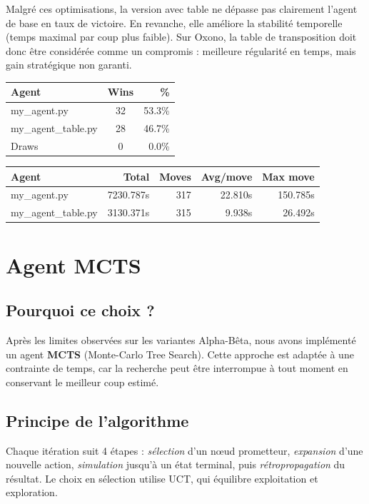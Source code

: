 \bigskip

Malgré ces optimisations, la version avec table ne dépasse pas clairement l'agent de base en taux de victoire. En revanche, elle améliore la stabilité temporelle (temps maximal par coup plus faible). Sur Oxono, la table de transposition doit donc être considérée comme un compromis : meilleure régularité en temps, mais gain stratégique non garanti.

\begin{tabular}{|l|c|r|}
    \hline
    Agent & Wins & \% \\
    \hline
    my\_agent.py & 32 & 53.3\% \\
    my\_agent\_table.py & 28 & 46.7\% \\
    Draws & 0 & 0.0\%\\
    \hline 
\end{tabular}
\begin{tabular}{|l|r|r|r|r|}
    \hline
    Agent & Total & Moves & Avg/move & Max move \\
    \hline
    my\_agent.py & 7230.787s & 317 & 22.810s & 150.785s \\
    my\_agent\_table.py & 3130.371s & 315 & 9.938s & 26.492s \\
    \hline
\end{tabular}

\section{Agent MCTS}

\subsection{Pourquoi ce choix ?}
Après les limites observées sur les variantes Alpha-Bêta, nous avons implémenté un agent \textbf{MCTS} (Monte-Carlo Tree Search). Cette approche est adaptée à une contrainte de temps, car la recherche peut être interrompue à tout moment en conservant le meilleur coup estimé.

\subsection{Principe de l'algorithme}
Chaque itération suit 4 étapes : \textit{sélection} d'un nœud prometteur, \textit{expansion} d'une nouvelle action, \textit{simulation} jusqu'à un état terminal, puis \textit{rétropropagation} du résultat. Le choix en sélection utilise UCT, qui équilibre exploitation et exploration.

